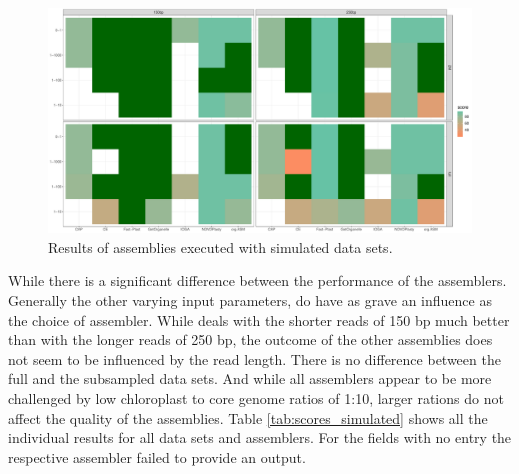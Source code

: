 \begin{figure}[H]
\centering
\includegraphics[height=.55\textheight, width=.99\textwidth]{Figures/sim_tiles}
\decoRule
\caption[Score of assemblies of simulated data sets]{Results of assemblies executed with simulated data sets.}
\label{fig:sim_tiles}
\end{figure}

While there is a significant difference between the performance of the assemblers. Generally the other varying
input parameters, do have as grave an influence as the choice of assembler. While \fp deals with the shorter
reads of 150 bp much better than with the longer reads of 250 bp, the outcome of the other assemblies does not
seem to be influenced by the read length. There is no difference between the full and the subsampled data
sets. And while all assemblers appear to be more challenged by low chloroplast to core genome ratios of 1:10,
larger rations do not affect the quality of the assemblies.  Table \ref{tab:scores_simulated} shows all the
individual results for all data sets and assemblers. For the fields with no entry the respective assembler
failed to provide an output.

